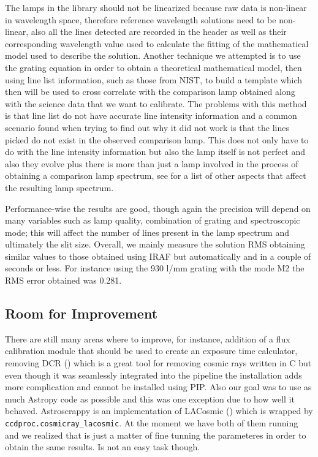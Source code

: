 \documentclass[11pt,twoside]{article}
\begin{document}
The lamps in the library should not be linearized because raw data is non-linear in wavelength space, therefore reference wavelength solutions need to be non-linear, also all the lines detected are recorded in the header as well as their corresponding wavelength value used to calculate the fitting of the mathematical model used to describe the solution. Another technique we attempted is to use the grating equation in order to obtain a theoretical mathematical model, then using line list information, such as those from NIST, to build a template which then will be used to cross correlate with the comparison lamp obtained along with the science data that we want to calibrate. The problems with this method is that line list do not have accurate line intensity information and a common scenario found when trying to find out why it did not work is that the lines picked do not exist in the observed comparison lamp. This does not only have to do with the line intensity information but also the lamp itself is not perfect and also they evolve plus there is more than just a lamp involved in the process of obtaining a comparison lamp spectrum, see \citet{2018A&A...618A.118S} for a list of other aspects that affect the resulting lamp spectrum.

Performance-wise the results are good, though again the precision will depend on many variables such as lamp quality, combination of grating and spectroscopic mode; this will affect the number of lines present in the lamp spectrum and ultimately the slit size. Overall, we mainly measure the solution RMS obtaining similar values to those obtained  using IRAF but automatically and in a couple of seconds or less. For instance  using the 930 l/mm grating with the mode M2 the RMS error obtained was 0.281.

\subsection{Room for Improvement}

There are still many areas where to improve, for instance, addition of a flux calibration module that should be used to create an exposure time calculator, removing DCR (\citet{2004PASP..116..148P}) which is a great tool for removing cosmic rays written in C but even though it was seamlessly integrated into the pipeline the installation adds more complication and cannot be installed using PIP. Also our goal was to use as much Astropy code as possible and this was one exception due to how well it behaved. Astroscrappy is an implementation of LACosmic (\citet{2001PASP..113.1420V}) which is wrapped by \verb=ccdproc.cosmicray_lacosmic=. At the moment we have both of them running and we realized that is just a matter of fine tunning the parameteres in order to obtain the same results. Is not an easy task though. 
\end{document}
